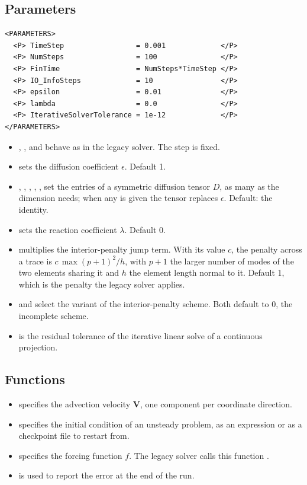 \subsection*{Parameters}
\begin{lstlisting}[style=XmlStyle]
<PARAMETERS>
  <P> TimeStep                 = 0.001             </P>
  <P> NumSteps                 = 100               </P>
  <P> FinTime                  = NumSteps*TimeStep </P>
  <P> IO_InfoSteps             = 10                </P>
  <P> epsilon                  = 0.01              </P>
  <P> lambda                   = 0.0               </P>
  <P> IterativeSolverTolerance = 1e-12             </P>
</PARAMETERS>
\end{lstlisting}
\begin{itemize}
\item {}, ,  and
   behave as in the legacy solver. The step is fixed.
\item {} sets the diffusion coefficient $\epsilon$. Default 1.
\item {}, , , , ,
   set the entries of a symmetric diffusion tensor $D$, as many as
  the dimension needs; when any is given the tensor replaces $\epsilon$.
  Default: the identity.
\item {} sets the reaction coefficient $\lambda$. Default 0.
\item {} multiplies the interior-penalty jump term. With
  its value $c$, the penalty across a trace is $c\,\max(p+1)^2/h$, with $p+1$
  the larger number of modes of the two elements sharing it and $h$ the
  element length normal to it. Default 1, which is the penalty the legacy
  solver applies.
\item {} and  select the variant
  of the interior-penalty scheme. Both default to 0, the incomplete scheme.
\item {} is the residual tolerance of the
  iterative linear solve of a continuous projection.
\end{itemize}

\subsection*{Functions}
\begin{itemize}
\item {} specifies the advection velocity
  $\mathbf{V}$, one component per coordinate direction.
\item {} specifies the initial condition of an
  unsteady problem, as an expression or as a checkpoint file to restart from.
\item {} specifies the forcing function $f$. The legacy solver
  calls this function .
\item {} is used to report the error at the end of the run.
\end{itemize}


